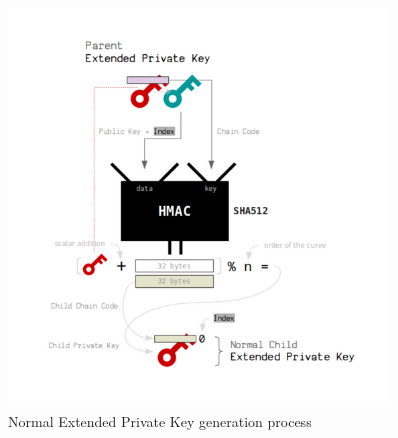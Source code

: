 \begin{figure}[ht!]
    \centering
    \includegraphics[width=0.9\textwidth]{images/normal_extended_private_gen.png}
    \caption[Normal Extended Private Key generation process]{Normal Extended Private Key generation process \cite{learnme}}
    \label{fig:1}
\end{figure}

